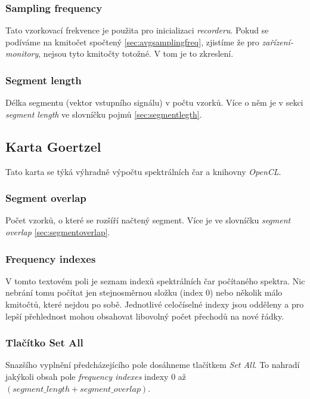 \subsubsection{Sampling frequency}

Tato vzorkovací frekvence je použita pro inicializaci \emph{recorderu}. Pokud se podíváme na kmitočet spočtený \ref{sec:avgsamplingfreq}, zjistíme že pro \emph{zařízení-monitory}, nejsou tyto kmitočty totožné. V tom je to zkreslení.

\subsubsection{Segment length}

Délka segmentu (vektor vstupního signálu) v počtu vzorků. Více o něm je v sekci \emph{segment length} ve slovníčku pojmů \ref{sec:segmentlegth}.

\subsection{Karta Goertzel}

Tato karta se týká výhradně výpočtu spektrálních čar a knihovny \emph{OpenCL}.

\subsubsection{Segment overlap}

Počet vzorků, o které se rozšíří načtený segment. Více je ve slovníčku \emph{segment overlap} \ref{sec:segmentoverlap}.

\subsubsection{Frequency indexes}

V tomto textovém poli je seznam indexů spektrálních čar počítaného spektra. Nic nebrání tomu počítat jen stejnosměrnou složku (index 0) nebo několik málo kmitočtů, které nejdou po sobě. Jednotlivé celočíselné indexy jsou odděleny \uv{;} a pro lepší přehlednost mohou obsahovat libovolný počet přechodů na nové řádky.

\subsubsection{Tlačítko Set All}

Snazšího vyplnění předcházejícího pole dosáhneme tlačítkem \emph{Set All}. To nahradí jakýkoli obsah pole \emph{frequency indexes} indexy $0$ až $(segment\_length + segment\_overlap)$.

